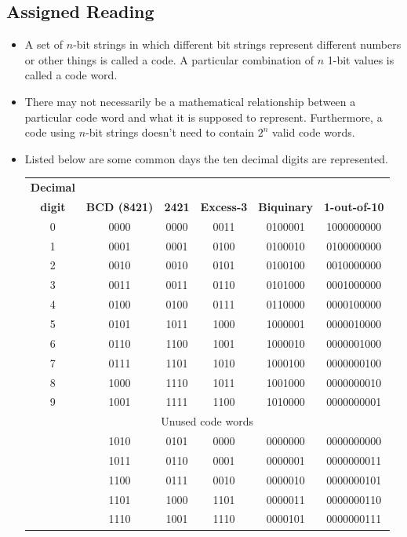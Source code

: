 \documentclass[10pt,a4paper]{article}
\begin{document}
\subsection{Assigned Reading}
\begin{itemize}
\item A set of $n$-bit strings in which different bit strings represent different numbers or other things is called a code. A particular combination of $n$ 1-bit values is called a code word. 
\item There may not necessarily be a mathematical relationship between a particular code word and what it is supposed to represent. Furthermore, a code using $n$-bit strings doesn't need to contain $2^n$ valid code words. 
\item Listed below are some common days the ten decimal digits are represented.\\
\begin{tabular}{|cccccc|}
\hline 
\textbf{Decimal} & & & & &\\
\textbf{digit} & \textbf{BCD (8421)} & \textbf{2421} & \textbf{Excess-3} & \textbf{Biquinary} & \textbf{1-out-of-10} \\
\hline 
0 & 0000 & 0000 & 0011 & 0100001 & 1000000000 \\ 
1 & 0001 & 0001 & 0100 & 0100010 & 0100000000 \\ 
2 & 0010 & 0010 & 0101 & 0100100 & 0010000000 \\ 
3 & 0011 & 0011 & 0110 & 0101000 & 0001000000 \\ 
4 & 0100 & 0100 & 0111 & 0110000 & 0000100000 \\  
5 & 0101 & 1011 & 1000 & 1000001 & 0000010000 \\ 
6 & 0110 & 1100 & 1001 & 1000010 & 0000001000 \\ 
7 & 0111 & 1101 & 1010 & 1000100 & 0000000100 \\ 
8 & 1000 & 1110 & 1011 & 1001000 & 0000000010 \\ 
9 & 1001 & 1111 & 1100 & 1010000 & 0000000001 \\ 
\hline 
\multicolumn{6}{|c|}{Unused code words} \\ 
\hline 
 & 1010 & 0101 & 0000 & 0000000 & 0000000000 \\ 
 & 1011 & 0110 & 0001 & 0000001 & 0000000011 \\  
 & 1100 & 0111 & 0010 & 0000010 & 0000000101 \\ 
 & 1101 & 1000 & 1101 & 0000011 & 0000000110 \\ 
 & 1110 & 1001 & 1110 & 0000101 & 0000000111 \\ 

\end{tabular}
\end{itemize}
\end{document}
